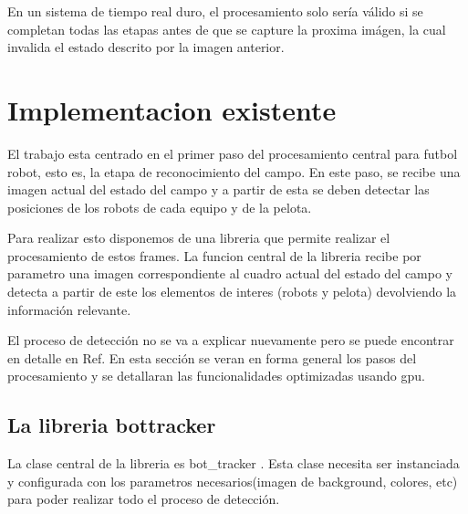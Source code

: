 \documentclass[a4paper,10pt]{report}
\begin{document}
En un sistema de tiempo real duro, el procesamiento solo sería válido si se completan todas las etapas antes de que se capture la proxima imágen, la cual invalida el estado descrito por la imagen anterior.

\section{Implementacion existente}

El trabajo esta centrado en el primer paso del procesamiento central para futbol robot, esto es, la etapa de reconocimiento del campo. 
En este paso, se recibe una imagen actual del estado del campo y a partir de esta se deben detectar las posiciones de los robots de cada equipo y de la pelota.


Para realizar esto disponemos de una libreria \cite{Jaureguiberry} que permite realizar el procesamiento de estos frames. 
La funcion central de la libreria recibe por parametro una imagen correspondiente al cuadro actual del estado del campo y detecta a partir de este los elementos de interes 
(robots y pelota) devolviendo la información relevante. 

El proceso de detección no se va a explicar nuevamente pero se puede encontrar en detalle en Ref. \cite[capitulo 5]{Jaureguiberry}
En esta sección se veran en forma general los pasos del procesamiento y se detallaran las funcionalidades optimizadas usando gpu.




\subsection{La libreria bottracker}

La clase central de la libreria es bot\_tracker \cite[]{Jaureguiberry}. 
Esta clase necesita ser instanciada y configurada con los parametros necesarios(imagen de background, colores, etc) para poder realizar todo el proceso de detección.

\end{document}
